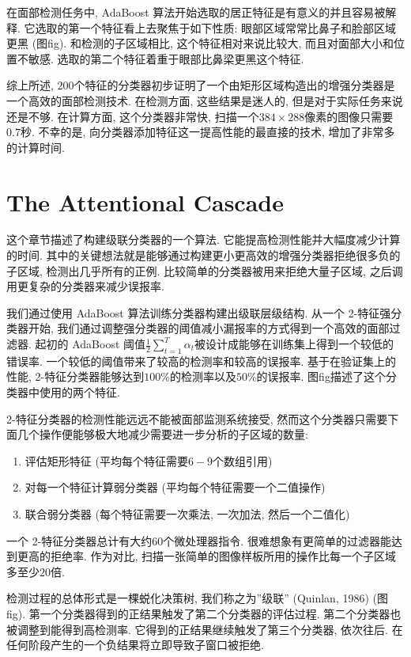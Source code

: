 \documentclass[utf8]{ctexart}
\begin{document}
在面部检测任务中, AdaBoost 算法开始选取的居正特征是有意义的并且容易被解释. 它选取的第一个特征看上去聚焦于如下性质: 眼部区域常常比鼻子和脸部区域更黑 (图fig). 和检测的子区域相比, 这个特征相对来说比较大, 而且对面部大小和位置不敏感. 选取的第二个特征着重于眼部比鼻梁更黑这个特征.

综上所述, $200$个特征的分类器初步证明了一个由矩形区域构造出的增强分类器是一个高效的面部检测技术. 在检测方面, 这些结果是迷人的, 但是对于实际任务来说还是不够. 在计算方面, 这个分类器非常快, 扫描一个$384\times288$像素的图像只需要$0.7$秒. 不幸的是, 向分类器添加特征这一提高性能的最直接的技术, 增加了非常多的计算时间.

\section{The Attentional Cascade}
这个章节描述了构建级联分类器的一个算法. 它能提高检测性能并大幅度减少计算的时间. 其中的关键想法就是能够通过构建更小更高效的增强分类器拒绝很多负的子区域, 检测出几乎所有的正例. 比较简单的分类器被用来拒绝大量子区域, 之后调用更复杂的分类器来减少误报率.

我们通过使用 AdaBoost 算法训练分类器构建出级联层级结构. 从一个 2-特征强分类器开始, 我们通过调整强分类器的阈值减小漏报率的方式得到一个高效的面部过滤器. 起初的 AdaBoost 阈值$\frac12\sum_{t=1}^T\alpha_t$被设计成能够在训练集上得到一个较低的错误率. 一个较低的阈值带来了较高的检测率和较高的误报率. 基于在验证集上的性能, 2-特征分类器能够达到$100\%$的检测率以及$50\%$的误报率. 图fig描述了这个分类器中使用的两个特征.

2-特征分类器的检测性能远远不能被面部监测系统接受, 然而这个分类器只需要下面几个操作便能够极大地减少需要进一步分析的子区域的数量:
\begin{enumerate}
\item 评估矩形特征 (平均每个特征需要$6-9$个数组引用)
\item 对每一个特征计算弱分类器 (平均每个特征需要一个二值操作)
\item 联合弱分类器 (每个特征需要一次乘法, 一次加法, 然后一个二值化)
\end{enumerate}

一个 2-特征分类器总计有大约$60$个微处理器指令. 很难想象有更简单的过滤器能达到更高的拒绝率. 作为对比, 扫描一张简单的图像样板所用的操作比每一个子区域多至少$20$倍.

检测过程的总体形式是一棵蜕化决策树, 我们称之为''级联'' (Quinlan, 1986) (图fig). 第一个分类器得到的正结果触发了第二个分类器的评估过程. 第二个分类器也被调整到能得到高检测率. 它得到的正结果继续触发了第三个分类器, 依次往后. 在任何阶段产生的一个负结果将立即导致子窗口被拒绝.
\end{document}
